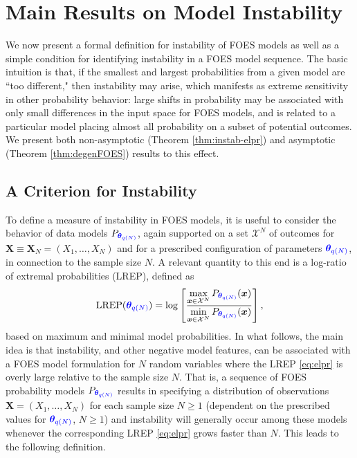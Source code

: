 \documentclass[numbib]{imamat}
\theoremstyle{theorem}
\theoremstyle{lemma}
\theoremstyle{example}
\theoremstyle{corollary}
\theoremstyle{definition}
\theoremstyle{remark}
\theoremstyle{approximation}
\theoremstyle{scheme}
\newcommand{\REP}{\mathrm{LREP}}
\newcommand{\thetaidx}{q(N)}
\newcommand{\thetaN}{\boldsymbol \theta_{\thetaidx}}
\newcommand{\ak}[1]{{\color{blue} #1}}
\begin{document}
\hypertarget{instability-results}{%
\section{Main Results on Model Instability}\label{instability-results}}

We now present a formal definition for instability of FOES models as well as a simple condition for identifying instability in a FOES model sequence. \ak{The basic intuition is that, if the smallest and largest probabilities from a given model are ``too different," then instability may arise, which manifests as extreme sensitivity in other probability behavior: large shifts in probability may be associated with only small differences in the input space for FOES models, and is related to a particular model placing almost all probability on a subset of potential outcomes. We present both non-asymptotic (Theorem \ref{thm:instab-elpr}) and asymptotic (Theorem \ref{thm:degenFOES}) results to this effect.}

\hypertarget{criterion}{%
\subsection{A Criterion for Instability}\label{criterion}}

To define a measure of instability in FOES models, it is useful to consider the behavior of data models \(P_{\ak{\thetaN}}\), again supported on a set \(\mathcal{X}^N\) of outcomes for \(\boldsymbol X\equiv \boldsymbol X_N =(X_1,\ldots,X_N)\) and for a prescribed configuration of parameters \(\ak{\thetaN}\), in connection to the sample size \(N\). A relevant quantity to this end is a log-ratio of extremal probabilities (LREP), defined as
\begin{align}
\label{eq:elpr}
 \REP (\ak{\thetaN})  =  \log \left[\frac{\max\limits_{  \boldsymbol x\in \mathcal{X}^N}P_{\ak{\thetaN}}( \boldsymbol x)}{\min\limits_{ \boldsymbol x \in \mathcal{X}^N}P_{\ak{\thetaN}}( \boldsymbol x)}\right],
\end{align}
based on maximum and minimal model probabilities. In what follows, the main idea is that instability, and other negative model features, can be associated with a FOES model formulation for \(N\) random variables where the LREP \eqref{eq:elpr} is overly large relative to the sample size \(N\). That is, a sequence of FOES probability models \(P_{\ak{\thetaN}}\) results in specifying \ak{a} distribution of observations \(\boldsymbol X=(X_1,\ldots,X_N)\) for each sample size \(N \geq 1\) \ak{(dependent on the prescribed values for $\ak{\thetaN}$, $N \geq 1$)} and instability will generally occur among these models whenever the corresponding LREP \eqref{eq:elpr} grows faster than \(N\). This leads to the following definition.
\end{document}
